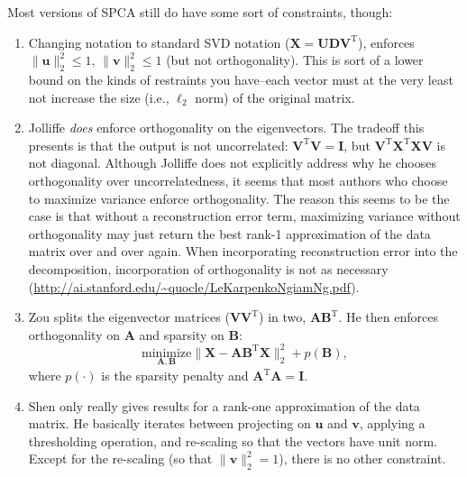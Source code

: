 \documentclass{article}
\newcommand{\transpose}{^\mathrm{T}}
\begin{document}
 Most versions of SPCA still do have some sort of constraints, though: 
\begin{enumerate}
\item Changing notation to standard SVD notation ($\mathbf{X} = \mathbf{UDV}^{\mathrm{T}}$), \cite{witten_penalized_2009} enforces $\|\mathbf{u}\|_2^2 \leq 1, \, \|\mathbf{v}\|_2^2 \leq 1$ (but not orthogonality). This is sort of a lower bound on the kinds of restraints you have--each vector must at the very least not increase the size (i.e., $\ell_2$ norm) of the original matrix. 
\item Jolliffe \cite{jolliffe_simplified_2000} \textit{does} enforce orthogonality on the eigenvectors.  The tradeoff this presents is that the output is not uncorrelated: $\mathbf{V}^{\mathrm{T}} \mathbf{V} = \mathbf{I}$, but $\mathbf{V}\transpose\mathbf{X}^{\mathrm{T}} \mathbf{XV}$ is not diagonal.  Although Jolliffe does not explicitly address why he chooses orthogonality over uncorrelatedness, it seems that most authors who choose to maximize variance enforce orthogonality.  The reason this seems to be the case is that without a reconstruction error term, maximizing variance without orthogonality may just return the best rank-1 approximation of the data matrix over and over again.  When incorporating reconstruction error into the decomposition, incorporation of orthogonality is not as necessary (\url{http://ai.stanford.edu/~quocle/LeKarpenkoNgiamNg.pdf}).  
\item Zou \cite{zou_sparse_2006} splits the eigenvector matrices ($\mathbf{VV}\transpose$) in two, $\mathbf{AB}\transpose$.  He then enforces orthogonality on $\mathbf{A}$ and sparsity on $\mathbf{B}$: 
\begin{equation}
\underset{\mathbf{A}, \mathbf{B}}{\text{minimize}} \| \mathbf{X} - \mathbf{A}\mathbf{B}\transpose \mathbf{X}\|_2^2 + p\left(\mathbf{B}\right),
\end{equation}
where $p\left(\cdot\right)$ is the sparsity penalty and $\mathbf{A}\transpose\mathbf{A} = \mathbf{I}$. 
\item Shen \cite{shen_sparse_2008} only really gives results for a rank-one approximation of the data matrix.  He basically iterates between projecting on $\mathbf{u}$ and $\mathbf{v}$, applying a thresholding operation, and re-scaling so that the vectors have unit norm.  Except for the re-scaling (so that $\|\mathbf{v}\|_2^2 = 1$), there is no other constraint.
\end{enumerate}
\end{document}
